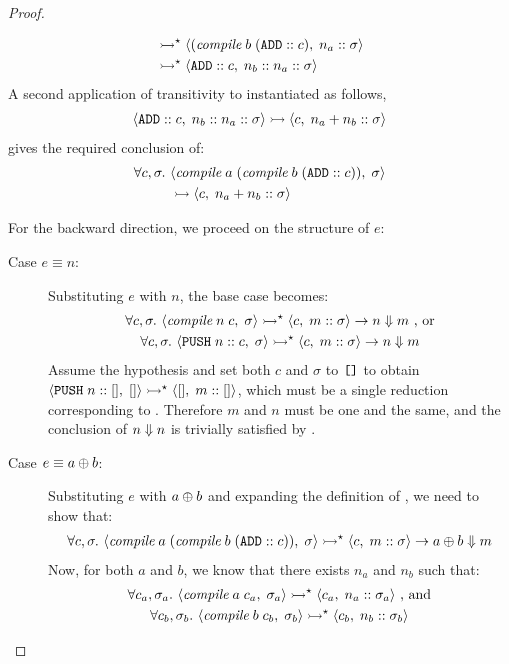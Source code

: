 \begin{proof}
\begin{description}
\begin{align*}
	&\ExecS \MS<(\compile\;b\;(\ADD :: c), n_a :: \sigma> \\
	&\ExecS \MS<\ADD :: c, n_b :: n_a :: \sigma>
\end{align*}
A second application of transitivity to  instantiated as
follows,
\begin{gather*}
	\MS<\ADD :: c, n_b :: n_a :: \sigma> \Exec \MS<c, n_a + n_b :: \sigma>
\end{gather*}
gives the required conclusion of:
\begin{align*}
	\forall c, \sigma.\
		&\MS<\compile\;a\;(\compile\;b\;(\ADD :: c)), \sigma> \\
		&\Exec \MS<c, n_a + n_b :: \sigma>
\end{align*}
\end{description}

For the backward direction, we proceed on the structure of $e$:
\begin{description}
\item[Case $e \equiv n$:]%
Substituting $e$ with $n$, the base case becomes:
\begin{gather*}
	\forall c, \sigma.\
		\MS<\compile\;n\;c, \sigma>
			\ExecS \MS<c, m :: \sigma>
	\rightarrow n \Eval m
	\textrm{ , or} \\
	\forall c, \sigma.\
		\MS<\PUSH n :: c, \sigma>
			\ExecS \MS<c, m :: \sigma>
	\rightarrow n \Eval m
\end{gather*}
Assume the hypothesis and set both $c$ and $\sigma$ to $\texttt{[]}$ to obtain
$\MS<\PUSH n :: [], []> \ExecS \MS<[], m :: []>$, which must be a single
reduction corresponding to . Therefore $m$ and $n$ must be
one and the same, and the conclusion of $n \Downarrow n$ is trivially satisfied
by \eqName{big-val}.
\item[Case $e \equiv a \oplus b$:]%
Substituting $e$ with $a \oplus b$ and expanding the definition of \compile,
we need to show that:
\begin{gather*}
	\forall c, \sigma.\
		\MS<\compile\;a\;(\compile\;b\;(\ADD :: c)), \sigma>
			\ExecS \MS<c, m :: \sigma>
	\rightarrow a \Add b \Eval m
\end{gather*}
Now, for both $a$ and $b$, we know that there exists $n_a$ and $n_b$ such
that:
\begin{gather*}
	\forall c_a, \sigma_a.\ \MS<\compile\;a\;c_a, \sigma_a>
		\ExecS \MS<c_a, n_a :: \sigma_a>
	\textrm{ , and} \\
	\forall c_b, \sigma_b.\ \MS<\compile\;b\;c_b, \sigma_b>
		\ExecS \MS<c_b, n_b :: \sigma_b>

\end{gather*}
\end{description}
\end{proof}
